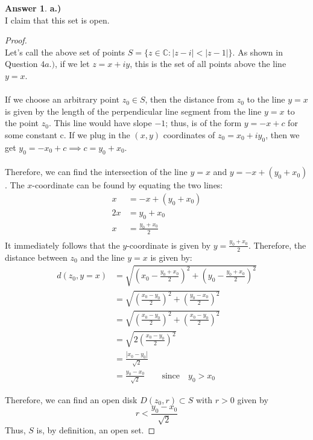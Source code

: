 \documentclass[10pt,a4paper]{article}
\theoremstyle{definition}
\newtheorem*{answer*}{Answer}
\begin{document}
\begin{answer*}{\textbf{a.)}}
\\I claim that this set is open.
\begin{proof}{$ $}
\\Let's call the above set of points $S = \{z \in \mathbb{C} : |z - i| < |z - 1|\}$. As shown in Question $4a.)$, if we let $z = x + iy$, this is the set of all points above the line $y = x$.\\
\\
If we choose an arbitrary point $z_0 \in S$, then the distance from $z_0$ to the line $y = x$ is given by the length of the perpendicular line segment from the line $y = x$ to the point $z_0$. This line would have slope $-1$; thus, is of the form $y = -x + c$ for some constant c. If we plug in the $(x,y)$ coordinates of $z_0 = x_0 + iy_0$, then we get $y_0 = -x_0 + c \implies c = y_0 + x_0$.\\
\\
Therefore, we can find the intersection of the line $y = x$ and $y = -x + (y_0 + x_0)$. The $x$-coordinate can be found by equating the two lines: 
\begin{align*}
x &= -x + (y_0 + x_0)\\
2x &= y_0 + x_0\\
x & = \frac{y_0 + x_0}{2}\\
\end{align*}
It immediately follows that the $y$-coordinate is given by $y = \frac{y_0 + x_0}{2}$. Therefore, the distance between $z_0$ and the line $y = x$ is given by:
\begin{align*}
d(z_0, y = x) &= \sqrt{\left(x_0 - \frac{y_0 + x_0}{2}\right)^2 + \left(y_0 - \frac{y_0 + x_0}{2}\right)^2}\\
&= \sqrt{\left(\frac{x_0 - y_0}{2}\right)^2 + \left(\frac{y_0 - x_0}{2}\right)^2}\\
&= \sqrt{\left(\frac{x_0 - y_0}{2}\right)^2 + \left(\frac{x_0 - y_0}{2}\right)^2}\\
&= \sqrt{2\left(\frac{x_0 - y_0}{2}\right)^2}\\
&= \frac{|x_0 - y_0|}{\sqrt{2}}\\
&= \frac{y_0 - x_0}{\sqrt{2}} \quad \quad \text{since} \quad y_0 > x_0
\end{align*}

Therefore, we can find an open disk $D(z_0, r) \subset S$ with $r > 0$ given by
\[r < \frac{y_0 - x_0}{\sqrt{2}}\]
Thus, $S$ is, by definition, an open set. 
\end{proof}


\end{answer*}
\end{document}
